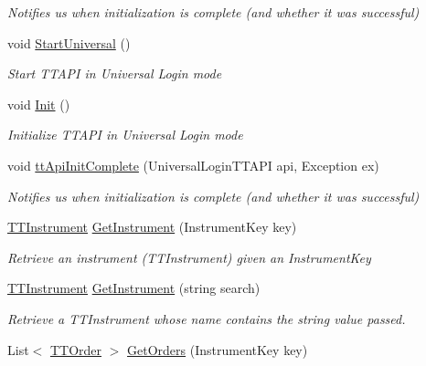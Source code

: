 \begin{DoxyCompactItemize}
\begin{DoxyCompactList}\small\item\em Notifies us when initialization is complete (and whether it was successful) \end{DoxyCompactList}\item 
void \hyperlink{class_e_z_a_p_i_1_1_t_t_a_p_i_functions_a764705a793ffd5ba96930f03c3f1313b}{Start\-Universal} ()
\begin{DoxyCompactList}\small\item\em Start T\-T\-A\-P\-I in Universal Login mode \end{DoxyCompactList}\item 
void \hyperlink{class_e_z_a_p_i_1_1_t_t_a_p_i_functions_a0764af9142d5b87f7b3d29518575dc05}{Init} ()
\begin{DoxyCompactList}\small\item\em Initialize T\-T\-A\-P\-I in Universal Login mode \end{DoxyCompactList}\item 
void \hyperlink{class_e_z_a_p_i_1_1_t_t_a_p_i_functions_a63ad034dd530bdc22620c9aa2c8f592c}{tt\-Api\-Init\-Complete} (Universal\-Login\-T\-T\-A\-P\-I api, Exception ex)
\begin{DoxyCompactList}\small\item\em Notifies us when initialization is complete (and whether it was successful) \end{DoxyCompactList}\item 
\hyperlink{class_e_z_a_p_i_1_1_containers_1_1_t_t_instrument}{T\-T\-Instrument} \hyperlink{class_e_z_a_p_i_1_1_t_t_a_p_i_functions_a1a30701e1112d6924e5fdd163807668b}{Get\-Instrument} (Instrument\-Key key)
\begin{DoxyCompactList}\small\item\em Retrieve an instrument (T\-T\-Instrument) given an Instrument\-Key \end{DoxyCompactList}\item 
\hyperlink{class_e_z_a_p_i_1_1_containers_1_1_t_t_instrument}{T\-T\-Instrument} \hyperlink{class_e_z_a_p_i_1_1_t_t_a_p_i_functions_a3dd6508809c54570cf3febd2f16b2672}{Get\-Instrument} (string search)
\begin{DoxyCompactList}\small\item\em Retrieve a T\-T\-Instrument whose name contains the string value passed. \end{DoxyCompactList}\item 
List$<$ \hyperlink{class_e_z_a_p_i_1_1_containers_1_1_t_t_order}{T\-T\-Order} $>$ \hyperlink{class_e_z_a_p_i_1_1_t_t_a_p_i_functions_a713e7b5792408c432f31a825ee74a97b}{Get\-Orders} (Instrument\-Key key)

\end{DoxyCompactItemize}
